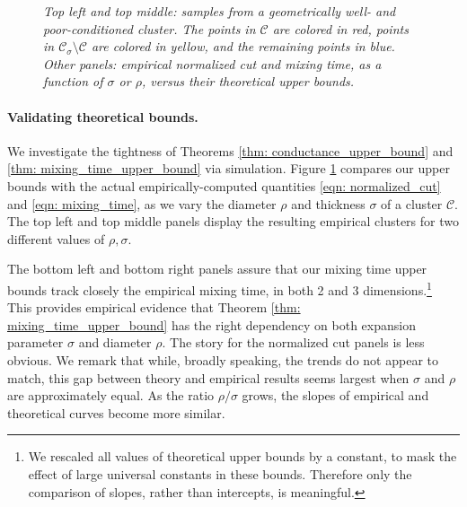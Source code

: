 \documentclass[11pt,twoside]{article}
\theoremstyle{definition}
\newcommand{\1}{\mathbbm{1}}
\newcommand{\Cset}{\mathcal{C}}
\newcommand{\Csig}{\Cset_{\sigma}}
\begin{document}
\begin{figure}[tb]
  \caption{\it\small Top left and top middle: samples from a geometrically
    well- and poor-conditioned cluster. The points in $\Cset$ are colored in 
    red, points in $\Csig \setminus \Cset$ are colored in yellow, and the
    remaining points in blue. Other panels: empirical normalized cut and mixing
    time, as a function of $\sigma$ or $\rho$, versus their theoretical upper
    bounds.} 
  \label{fig:bounds}
\end{figure}

\paragraph{Validating theoretical bounds.}  We investigate the tightness of
Theorems \ref{thm: conductance_upper_bound} and \ref{thm:
  mixing_time_upper_bound} via simulation. Figure \ref{fig:bounds} compares our
upper bounds with the actual empirically-computed quantities \eqref{eqn:
  normalized_cut} and \eqref{eqn: mixing_time}, as we vary the diameter $\rho$
and thickness $\sigma$ of a cluster $\Cset$. The top left and top middle panels
display the resulting empirical clusters for two different values of
$\rho,\sigma$. 

The bottom left and bottom right panels assure that our mixing  
time upper bounds track closely the empirical mixing time, in both 2 and 3 
dimensions.\footnote{We rescaled all values of theoretical upper
  bounds by a constant, to mask the effect of large universal constants
  in these bounds. Therefore only the comparison of slopes, rather than
  intercepts, is meaningful.} This provides empirical evidence that Theorem
\ref{thm: mixing_time_upper_bound} has the right dependency on both expansion
parameter $\sigma$ and diameter $\rho$. The story for the normalized cut panels
is less obvious. We remark that while, broadly speaking, the trends do not
appear to match, this gap between theory and empirical results seems largest
when $\sigma $ and $\rho$ are approximately equal. As the ratio $\rho/\sigma$
grows, the slopes of empirical and theoretical curves become more similar.
\end{document}
